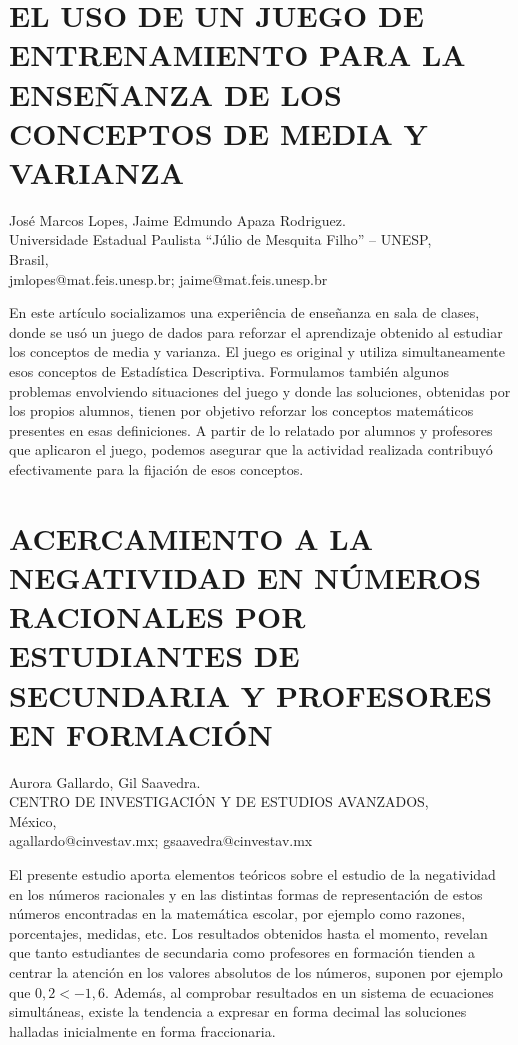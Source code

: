 \section{EL USO DE UN JUEGO DE ENTRENAMIENTO PARA LA ENSEÑANZA DE LOS CONCEPTOS
DE MEDIA Y VARIANZA}

\begin{datos}
José Marcos Lopes, Jaime Edmundo Apaza Rodriguez. \\
Universidade Estadual Paulista “Júlio de Mesquita Filho” – UNESP,\\
\hfill Brasil, \\
 \hfill jmlopes@mat.feis.unesp.br; jaime@mat.feis.unesp.br 
\end{datos}

En este artículo socializamos una experiência de enseñanza en sala
de clases, donde se usó un juego de dados para reforzar el aprendizaje
obtenido al estudiar los conceptos de media y varianza. El juego es
original y utiliza simultaneamente esos conceptos de Estadística Descriptiva.
Formulamos también algunos problemas envolviendo situaciones del juego
y donde las soluciones, obtenidas por los propios alumnos, tienen
por objetivo reforzar los conceptos matemáticos presentes en esas
definiciones. A partir de lo relatado por alumnos y profesores que
aplicaron el juego, podemos asegurar que la actividad realizada contribuyó
efectivamente para la fijación de esos conceptos.


\section{ACERCAMIENTO A LA NEGATIVIDAD EN NÚMEROS RACIONALES POR ESTUDIANTES
DE SECUNDARIA Y PROFESORES EN FORMACIÓN}

\begin{datos}
Aurora Gallardo, Gil Saavedra. \\
CENTRO DE INVESTIGACIÓN Y DE ESTUDIOS AVANZADOS,\\
\hfill México, \\
 \hfill agallardo@cinvestav.mx; gsaavedra@cinvestav.mx 
\end{datos}

El presente estudio aporta elementos teóricos sobre el estudio de
la negatividad en los números racionales y en las distintas formas
de representación de estos números encontradas en la matemática escolar,
por ejemplo como razones, porcentajes, medidas, etc. Los resultados
obtenidos hasta el momento, revelan que tanto estudiantes de secundaria
como profesores en formación tienden a centrar la atención en los
valores absolutos de los números, suponen por ejemplo que $0,2<-1,6$.
Además, al comprobar resultados en un sistema de ecuaciones simultáneas,
existe la tendencia a expresar en forma decimal las soluciones halladas
inicialmente en forma fraccionaria.


